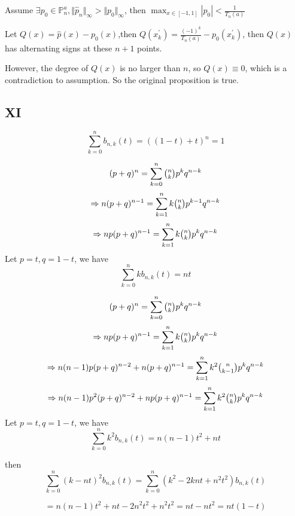 \documentclass[12]{article}%
\begin{document}
            Assume $\exists p_0 \in \mathbb{P}^a_n,\Vert \hat{p}_n\Vert_\infty > \Vert p_0 \Vert_\infty$, then $\max_{x\in[-1,1]}|p_0|<\frac{1}{T_n(a)}$
            
            
            Let $Q(x)=\hat{p}(x)-p_0(x)$,then $Q(x^{'}_k)=\frac{(-1)^k}{T_n(a)}-p_0(x^{'}_k)$, then $Q(x)$ has alternating signs at these $n + 1$ points.

            However, the degree of $Q(x)$ is no larger than $n$, so $Q(x)\equiv 0$, which is a contradiction to assumption. So the original proposition is true.
        

        \subsection{XI}
            $$\sum_{k=0}^nb_{n,k}(t)=((1-t)+t)^n=1$$

            $$(p+q)^n=\sum_{k=0}^n\tbinom{n}{k}p^kq^{n-k}$$
            $$\Rightarrow n(p+q)^{n-1}=\sum_{k=1}^nk\tbinom{n}{k}p^{k-1}q^{n-k}$$
            $$\Rightarrow np(p+q)^{n-1}=\sum_{k=1}^nk\tbinom{n}{k}p^{k}q^{n-k}$$
            Let $p=t,q=1-t$, we have
            $$\sum_{k=0}^nkb_{n,k}(t)=nt$$


            $$(p+q)^n=\sum_{k=0}^n\tbinom{n}{k}p^kq^{n-k}$$
            $$\Rightarrow np(p+q)^{n-1}=\sum_{k=1}^nk\tbinom{n}{k}p^{k}q^{n-k}$$
            $$\Rightarrow n(n-1)p(p+q)^{n-2}+n(p+q)^{n-1}=\sum_{k=1}^nk^2\tbinom{n}{k-1}p^{k}q^{n-k}$$
            $$\Rightarrow n(n-1)p^2(p+q)^{n-2}+np(p+q)^{n-1}=\sum_{k=1}^nk^2\tbinom{n}{k}p^{k}q^{n-k}$$
            Let $p=t,q=1-t$, we have
            $$\sum_{k=0}^nk^2b_{n,k}(t)=n(n-1)t^2+nt$$

            then 
            $$\sum_{k=0}^n(k-nt)^2b_{n,k}(t)=\sum_{k=0}^n(k^2-2knt+n^2t^2)b_{n,k}(t)$$

            $$=n(n-1)t^2+nt-2n^2t^2+n^2t^2=nt-nt^2=nt(1-t)$$
\end{document}
